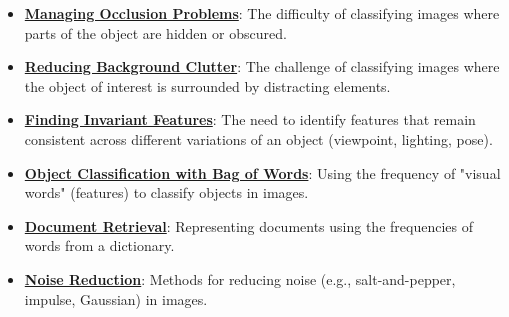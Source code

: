 \documentclass{article}%
\begin{document}
\begin{itemize}[leftmargin=*]
\item \href{https://purdue.brightspace.com/d2l/common/assets/pdfjs-d2l-dist/1.0.14-legacy/web/viewer.html?file=%2Fcontent%2Fenforced%2F1095467-wl.202510.CS.24300.001%2F07L2-Vision.pdf%3Fou%3D1095467&lang=en-us&container=d2l-fileviewer-rendered-pdf&fullscreen=d2l-fileviewer-rendered-pdf-dialog&height=667#page=9}{\textbf{Managing Occlusion Problems}}: The difficulty of classifying images where parts of the object are hidden or obscured.%
\item \href{https://purdue.brightspace.com/d2l/common/assets/pdfjs-d2l-dist/1.0.14-legacy/web/viewer.html?file=%2Fcontent%2Fenforced%2F1095467-wl.202510.CS.24300.001%2F07L2-Vision.pdf%3Fou%3D1095467&lang=en-us&container=d2l-fileviewer-rendered-pdf&fullscreen=d2l-fileviewer-rendered-pdf-dialog&height=667#page=10}{\textbf{Reducing Background Clutter}}: The challenge of classifying images where the object of interest is surrounded by distracting elements.%
\item \href{https://purdue.brightspace.com/d2l/common/assets/pdfjs-d2l-dist/1.0.14-legacy/web/viewer.html?file=%2Fcontent%2Fenforced%2F1095467-wl.202510.CS.24300.001%2F07L2-Vision.pdf%3Fou%3D1095467&lang=en-us&container=d2l-fileviewer-rendered-pdf&fullscreen=d2l-fileviewer-rendered-pdf-dialog&height=667#page=11}{\textbf{Finding Invariant Features}}: The need to identify features that remain consistent across different variations of an object (viewpoint, lighting, pose).%
\item \href{https://purdue.brightspace.com/d2l/common/assets/pdfjs-d2l-dist/1.0.14-legacy/web/viewer.html?file=%2Fcontent%2Fenforced%2F1095467-wl.202510.CS.24300.001%2F07L2-Vision.pdf%3Fou%3D1095467&lang=en-us&container=d2l-fileviewer-rendered-pdf&fullscreen=d2l-fileviewer-rendered-pdf-dialog&height=667#page=12}{\textbf{Object Classification with Bag of Words}}: Using the frequency of "visual words" (features) to classify objects in images.%
\item \href{https://purdue.brightspace.com/d2l/common/assets/pdfjs-d2l-dist/1.0.14-legacy/web/viewer.html?file=%2Fcontent%2Fenforced%2F1095467-wl.202510.CS.24300.001%2F07L2-Vision.pdf%3Fou%3D1095467&lang=en-us&container=d2l-fileviewer-rendered-pdf&fullscreen=d2l-fileviewer-rendered-pdf-dialog&height=667#page=20}{\textbf{Document Retrieval}}: Representing documents using the frequencies of words from a dictionary.%
\item \href{https://purdue.brightspace.com/d2l/common/assets/pdfjs-d2l-dist/1.0.14-legacy/web/viewer.html?file=%2Fcontent%2Fenforced%2F1095467-wl.202510.CS.24300.001%2F07L2-Vision.pdf%3Fou%3D1095467&lang=en-us&container=d2l-fileviewer-rendered-pdf&fullscreen=d2l-fileviewer-rendered-pdf-dialog&height=667#page=33}{\textbf{Noise Reduction}}: Methods for reducing noise (e.g., salt-and-pepper, impulse, Gaussian) in images.%

\end{itemize}
\end{document}
